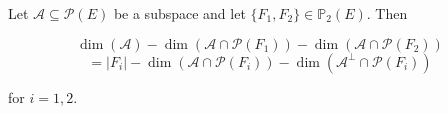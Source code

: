 Let $\mathcal{A} \subseteq \mathcal{P}(E)$ be a subspace and let $\{F_1, F_2\} \in \mathbb{P}_2(E)$. Then

$$\dim(\mathcal{A}) - \dim(\mathcal{A} \cap \mathcal{P}(F_1)) - \dim(\mathcal{A} \cap \mathcal{P}(F_2))$$
$$= |F_i| - \dim(\mathcal{A} \cap \mathcal{P}(F_i)) - \dim(\mathcal{A}^\perp \cap \mathcal{P}(F_i))$$

for $i = 1, 2$.
